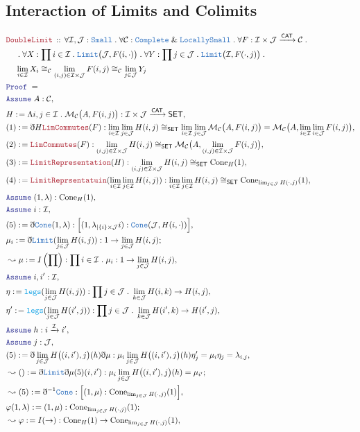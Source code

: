\documentclass[12pt]{scrartcl}
\newcommand{\TYPE}[1]{\textcolor{NavyBlue}{\mathtt{#1}}}
\newcommand{\FUNC}[1]{\textcolor{Cerulean}{\mathtt{#1}}}
\newcommand{\LOGIC}[1]{\textcolor{Blue}{\mathtt{#1}}}
\newcommand{\THM}[1]{\textcolor{Maroon}{\mathtt{#1}}}
\renewcommand{\.}{\; . \;}
\newcommand{\de}{: \kern 0.1pc =}
\newcommand{\Theorem}[2]{& \THM{#1} \, :: \, #2 \\ & \Proof = \\ }
\newcommand{\NewLine}{\\ & \kern 1pc}
\newcommand{\Page}[1]{ \begin{align*} #1 \end{align*}   }
\newcommand{ \bd }{ \ByDef }
\renewcommand{\And}{\; \& \;}
\newcommand{\Mor}{\mathcal{M}}
\newcommand{\Arrow}{\xrightarrow}
\newcommand{\Say}[3]{& #1 \de #2 : #3, \\}
\newcommand{\Conclude}[3]{& #1 \de #2 : #3; \\}
\newcommand{\Derive}[3]{& \leadsto #1 \de #2 : #3, \\}
\newcommand{\DeriveConclude}[3]{& \leadsto #1 \de #2 : #3 ; \\}
\newcommand{\Assume}[2]{& \LOGIC{Assume} \; #1 : #2, \\}
\newcommand{\ByDef}{\eth}
\newcommand{\Proof}{\LOGIC{Proof} \; }
\newcommand{\C}{\mathcal{C}}
\newcommand{\I}{\mathcal{I}}
\newcommand{\J}{\mathcal{J}}
\newcommand{\CAT}{\mathsf{CAT}}
\newcommand{\SET}{\mathsf{SET}}
\begin{document}
\subsection{Interaction of Limits and Colimits}
\Page{
	\Theorem{DoubleLimit}{
			\forall \I,\J : \TYPE{Small} \. \forall \C : \TYPE{Complete} \And \TYPE{LocallySmall} \. 
			\forall F : \I \times \J \Arrow{\CAT} \C \. \NewLine \.
			\forall X : \prod i \in \I \. \TYPE{Limit}\big(\J,F(i,\cdot)\big) \.
			\forall Y : \prod j \in \J \. \TYPE{Limit}\big(\I,F(\cdot,j)\big) \. \NewLine
			\lim_{i \in \I} X_i \cong_\C \lim_{(i,j) \in \I \times \J} F(i,j) \cong_\C \lim_{j \in \J} Y_j
		}
		\Assume{A}{\C}
		\Say{H}{ \Lambda i,j \in \I \. \Mor_{\C}\big(A,F(i,j)\big) }{\I \times \J \Arrow{\CAT} \SET }
		\Say{(1)}{\bd H \THM{LimCommutes}(F)}
		{
			\lim_{i \in \I} \lim_{j \in \J} H(i,j) \cong_\SET
			\lim_{i \in \I} \lim_{j \in \J} \Mor_\C\big(A,F(i,j)\big) =
			\Mor_\C\big(A, \lim_{i \in \I} \lim_{i \in \J }F(i,j)\big)
		}
		\Say{(2)}{ \THM{LimCommutes}(F)}
		{ 
			\lim_{(i,j) \in \I \times \J } H(i,j) \cong_\SET
			\Mor_\C\big( A , \lim_{(i,j) \in \I \times \J} F(i,j)  \big)
		}
		\Say{(3)}{\THM{LimitRepresentation}(H)}{\lim_{(i,j) \in \I \times \J} H(i,j) \cong_{\SET} \mathrm{Cone}_{H}(1)}
		\Say{(4)}{ \THM{LimitReprsentatuin}(\lim_{i \in \I} \lim_{j \in \I} H(i,j))}
		{ \lim_{i \in \I} \lim_{j \in \I} H(i,j) \cong_{\SET} \mathrm{Cone}_{\lim_{j \in \J} H(\cdot,j)}(1) }
		\Assume{(1,\lambda)}{\mathrm{Cone}_{H}(1)}
		\Assume{i}{\I}
		\Say{(5)}{\bd \TYPE{Cone}(1,\lambda)}{\Big[(1,\lambda_{|\{i\} \times \J}i) :\TYPE{Cone}(\J, H(i,\cdot))\Big]}
		\Conclude{\mu_i}{\bd \TYPE{Limit}(\lim_{j \in \J} H(i,j))}{ 1 \to \lim_{j \in \J} H(i,j)}
		\Derive{\mu}{I\left(\prod\right)}{\prod i \in \I \. \mu_i : 1 \to \lim_{j \in \J} H(i,j) }
		\Assume{i,i'}{\I}
		\Say{\eta}{\FUNC{legs}(\lim_{j \in \J} H(i,j ))}{\prod j \in \J \. \lim_{k \in \J} H(i,k) \to H(i,j) }
		\Say{\eta'}{\FUNC{legs}(\lim_{j \in \J}  H(i',j) )}{\prod j \in \J \. \lim_{k \in \J} H(i',k) \to H(i',j)}
		\Assume{h}{i \Arrow{\I} i'}
		\Assume{j}{\J}
		\Say{(5)}{\bd  \lim_{j \in \J } H\big((i,i'),j \big)(h)\bd \mu}
		{   \mu_i \lim_{j \in \J} H\big((i,i'),j \big)(h)\eta'_j = \mu_i \eta_j = \lambda_{i,j}  }
		\DeriveConclude{()}{\bd \TYPE{Limit} \bd \mu (5)(i,i')}
		{ \mu_i \lim_{j \in \J} H\big( (i,i'),j\big)(h) = \mu_{i'}  }
		\Derive{(5)}{\bd^{-1} \TYPE{Cone}}{\Big[  (1,\mu) :  \mathrm{Cone}_{\lim_{j \in \J} H(\cdot,j)}(1)   \Big]}
		\Conclude{\varphi(1,\lambda)}{(1,\mu)}{\mathrm{Cone}_{\lim_{j \in \J} H(\cdot,j)}(1)}
		\Derive{\varphi}{I(\to)}{\mathrm{Cone}_H(1) \to \mathrm{Cone}_{\lim_{j \in \J} H(\cdot,j)}(1) }
}
\end{document}

